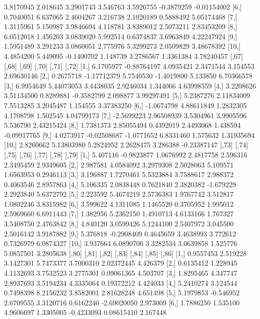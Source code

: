 \documentclass[12pt]{article}
\begin{document}
\begin{Schunk}
\begin{Soutput}
 [5,]  3.8170945 2.018645  3.2901743 3.546763 3.5926755 -0.3879259 -0.01154002
 [6,]  0.7040051 6.637065  2.4604267 3.216738 2.1020189  0.5888492  5.05174468
 [7,]  1.3115961 5.150987  3.9846694 4.118781 3.8389012  2.5073211  2.83453209
 [8,]  6.0512018 1.456203  3.0839020 5.992514 0.6374837  3.6963849  4.22247924
 [9,]  1.5951489 3.291233  3.0860051 2.775976 5.3299273  2.0509829  3.48678392
[10,]  4.4854200 5.449095 -0.1400702 1.148739 3.2786567  1.3361384  3.78240457
           [,67]       [,68]      [,69]      [,70]    [,71]       [,72]
 [1,]  6.1705977 -0.88764197  4.0935421  2.3471544 3.154553  2.69630146
 [2,]  0.2675718 -1.17712379  5.7540530 -1.4019800 5.133850  6.70366578
 [3,]  6.9954649  5.44073053  3.4438035  2.9246034 1.344066  4.63998559
 [4,]  3.2208626  3.51134500  0.8289881 -0.3582799 2.098877  3.99297491
 [5,]  5.2387276  2.11834009  7.5513285  3.2045487 1.154555  3.37383250
 [6,] -1.0674798  4.88611849  1.2832305  4.1708798 1.502545  4.04799173
 [7,] -2.5699223  2.96508939  3.5304961  3.9905596 5.536790  2.43215424
 [8,]  1.7381373  2.85055494  0.4392019  2.4493068 1.438594 -0.09917765
 [9,]  4.0273917 -0.02508687 -1.0771652  6.8331460 1.575632  1.31935694
[10,]  2.8260662  5.13803980  5.2824952  2.2628475 3.286388 -0.23387147
         [,73]      [,74]     [,75]     [,76]     [,77]     [,78]     [,79]
 [1,] 5.407116 -0.9823877 1.0676992 2.4817758  2.596316 2.3495459 2.9349605
 [2,] 2.987581  4.0584092 3.2979308 2.5028063  5.109571 1.6563953 0.2946113
 [3,] 3.196887  1.7270461 5.5323884 3.7588617  2.988372 0.4063546 2.8957863
 [4,] 5.106335  2.0838448 0.7621840 2.3820382 -1.679229 2.2923840 5.6372792
 [5,] 2.223592  5.4674219 2.5736383 1.9767742  3.512817 1.0802246 3.8315982
 [6,] 3.599622  4.1311085 1.1465520 0.3705952  1.995012 2.5969660 6.6911443
 [7,] 1.382956  5.2362150 1.4910713 4.6133166  1.767327 3.5408750 2.4763842
 [8,] 4.840120  3.0599426 5.1244100 2.5407972  3.045500 2.5016142 3.9187882
 [9,] 5.376818 -0.2908409 0.4645659 3.4638993  3.772612 0.7326979 6.0874327
[10,] 3.937664  6.0890706 3.3282534 3.0639858  1.525776 5.0857501 3.2805638
          [,80]     [,81]     [,82]      [,83]      [,84]       [,85]    [,86]
 [1,] 0.9557453  2.519228 3.1427301  5.7473377  3.7000310  2.02372445 4.426379
 [2,] 0.6135412  1.228945 4.1132693  3.7532523  3.2775301  0.09061365 4.503707
 [3,] 1.8295465  4.347747 2.8937693  3.5194234  4.3335064  0.19372212 4.424033
 [4,] 5.2410274  3.124544 0.7498398  8.2156232  3.8582001  2.81628248 4.651498
 [5,] 5.1979853 -0.546952 2.6709555  3.3120716  0.6162240 -2.69020050 2.973009
 [6,] 1.7886250  1.535100 4.9606697  1.3305005 -0.4233093  0.08615410 2.167448

\end{Soutput}
\end{Schunk}
\end{document}
